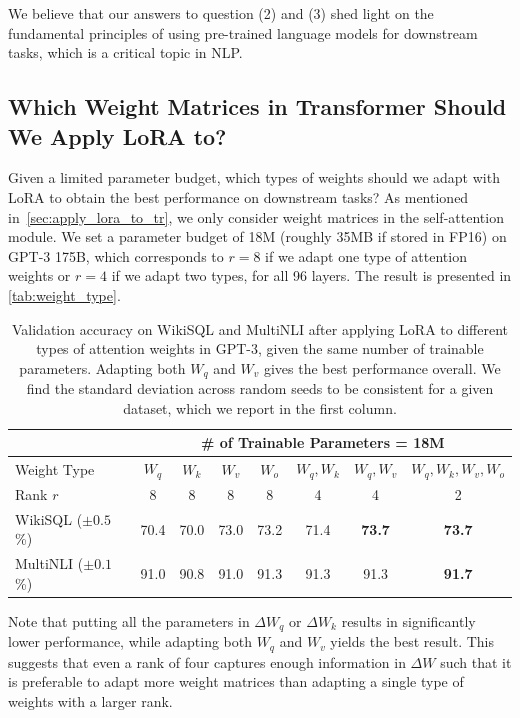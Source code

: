 We believe that our answers to question (2) and (3) shed light on the fundamental principles of using pre-trained language models for downstream tasks, which is a critical topic in NLP. 



\subsection{Which Weight Matrices in Transformer Should We Apply LoRA to?}
\label{sec:weight_types}
Given a limited parameter budget, which types of weights should we adapt with LoRA to obtain the best performance on downstream tasks?
As mentioned in~\autoref{sec:apply_lora_to_tr}, we only consider weight matrices in the self-attention module.
We set a parameter budget of 18M (roughly 35MB if stored in FP16) on GPT-3 175B, which corresponds to $r=8$ if we adapt one type of attention weights or $r=4$ if we adapt two types, for all 96 layers.
The result is presented in \autoref{tab:weight_type}.

\begin{table}[h]
  \centering
  \begin{tabular}{l|ccccccc}
  \hline
  \toprule
                & \multicolumn{7}{c}{\# of Trainable Parameters = 18M} \\
  \midrule
  Weight Type           & $W_q$  & $W_k$  & $W_v$  & $W_o$      & $W_q,W_k$     & $W_q,W_v$     & $W_q, W_k, W_v, W_o$      \\
  Rank $r$              & 8      &  8     &  8     &   8        &   4           &   4           &   2                       \\
  \midrule
  WikiSQL ($\pm0.5$\%)  & 70.4   & 70.0   & 73.0   & 73.2       & 71.4          & \textbf{73.7} & \textbf{73.7}             \\
  MultiNLI ($\pm0.1$\%) & 91.0   & 90.8   & 91.0   & 91.3       & 91.3          & 91.3          & \textbf{91.7}              \\
  \bottomrule
  \end{tabular}
  \caption{Validation accuracy on WikiSQL and MultiNLI after applying LoRA to different types of attention weights in GPT-3, given the same number of trainable parameters. Adapting both $W_q$ and $W_v$ gives the best performance overall. We find the standard deviation across random seeds to be consistent for a given dataset, which we report in the first column.}
  \label{tab:weight_type}
\end{table}

Note that putting all the parameters in $\Delta W_q$ or $\Delta W_k$ results in significantly lower performance, while adapting both $W_q$ and $W_v$ yields the best result.
This suggests that even a rank of four captures enough information in $\Delta W$ such that it is preferable to adapt more weight matrices than adapting a single type of weights with a larger rank.

